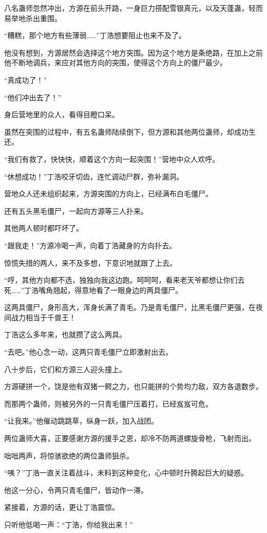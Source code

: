 \begin{this_body}
八名蛊师忽然冲出，方源在前头开路，一身巨力搭配雪银真元，以及天蓬蛊，轻而易举地杀出重围。

“糟糕，那个地方有些薄弱……”丁浩想要阻止也来不及了。

他没有想到，方源居然会选择这个地方突围。因为这个地方是条绝路，在加上之前他不断地调兵，来应对其他方向的突围，使得这个方向上的僵尸最少。

“真成功了！”

“他们冲出去了！”

身后营地里的众人，看得目瞪口呆。

虽然在突围的过程中，有五名蛊师陆续倒下，但方源和其他两位蛊师，却成功生还。

“我们有救了，快快快，顺着这个方向一起突围！”营地中众人欢呼。

“休想成功！”丁浩咬牙切齿，连忙调动尸群，弥补漏洞。

营地众人还未组织起来，方源突围的方向上，已经满布白毛僵尸。

还有五头黑毛僵尸，一起向方源等三人扑来。

其他两人顿时都吓坏了。

“跟我走！”方源冷喝一声，向着丁浩藏身的方向扑去。

惊慌失措的两人，来不及多想，下意识地就跟了上去。

“哼，其他方向都不选，独独向我这边跑。呵呵呵，看来老天爷都想让你们去死……”丁浩嘴角翘起，得意地看了一眼身边的两具僵尸。

这两具僵尸，身形高大，浑身长满了青毛。乃是青毛僵尸，比黑毛僵尸更强，在夜间战力相当于千兽王！

丁浩这么多年来，也就攒了这么两具。

“去吧。”他心念一动，这两只青毛僵尸立即激射出去。

八十步后，它们和方源三人迎头撞上。

方源硬拼一个，饶是他有双猪一鳄之力，也只能拼的个势均力敌，双方各退数步。

而那两个蛊师，则被另外的一只青毛僵尸压着打，已经岌岌可危。

“让我来。”他催动跳跳草，纵身一跃，加入战团。

两位蛊师大喜，正要感谢方源的援手之恩，却冷不防两道螺旋骨枪，飞射而出。

咄咄两声，将惊骇欲绝的两位蛊师狙杀。

“咦？”丁浩一直关注着战斗，未料到这种变化，心中顿时升腾起巨大的疑惑。

他这一分心，令两只青毛僵尸，皆动作一滞。

紧接着，方源的话，更让丁浩震惊。

只听他低喝一声：“丁浩，你给我出来！”

\end{this_body}

